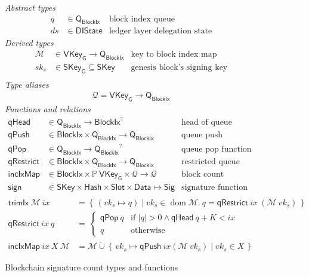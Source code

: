 \documentclass[11pt,a4paper]{article}
\DeclareMathOperator{\dom}{dom}
\newcommand{\powerset}[1]{\mathbb{P}~#1}
\newcommand\Set[2]{\left\{\,#1\mid#2\,\right\}}
\newcommand{\unionoverride}{\mathbin{\underrightarrow\cup}}
\newcommand{\var}[1]{\mathit{#1}}
\newcommand{\fun}[1]{\mathsf{#1}}
\newcommand{\type}[1]{\mathsf{#1}}
\newcommand{\size}[1]{\left| #1 \right|}
\newcommand{\Hash}{\type{Hash}}  %
\newcommand{\Slot}{\type{Slot}}
\newcommand{\BlockIx}{\type{BlockIx}}
\newcommand{\Queue}{\type{Q}}
\newcommand{\SKey}{\type{SKey}}
\newcommand{\SKeyGen}{\type{SKey_G}}
\newcommand{\VKeyGen}{\type{VKey_G}}
\newcommand{\Sig}{\type{Sig}}
\newcommand{\Data}{\type{Data}}
\newcommand{\DelegState}{\type{DIState}}
\newcommand{\signname}{sign}
\newcommand{\signmapname}{\mathcal{M}}
\newcommand{\trimixname}{trimIx}
\newcommand{\incixmapname}{incIxMap}
\newcommand{\qrestrname}{qRestrict}
\newcommand{\qpopname}{qPop}
\newcommand{\qheadname}{qHead}
\newcommand{\qpushname}{qPush}
\newcommand{\signmap}[1]{\fun{\signmapname} ~ #1}
\newcommand{\qrestr}[2]{\fun{\qrestrname} ~ #1 ~ #2}
\newcommand{\trimix}[2]{\fun{\trimixname} ~ #1 ~ #2}
\newcommand{\incixmap}[3]{\fun{\incixmapname} ~ #1 ~ #2 ~ #3}
\newcommand{\qpop}[1]{\fun{\qpopname} ~ #1}
\newcommand{\qhead}[1]{\fun{\qheadname} ~ #1}
\newcommand{\qpush}[1]{\fun{\qpushname} ~ #1}
\newcommand{\totalf}{\to}
\newcommand{\partialf}{\mapsto}
\newcommand{\mapqueue}{\mathcal{Q}}
\begin{document}
\begin{figure}[ht]
  \emph{Abstract types}
  \begin{align*}
    q  & \in \Queue_\BlockIx  & \text{block index queue}\\
    \var{ds} & \in \DelegState & \text{ledger layer delegation state}
  \end{align*}
  \emph{Derived types}
  \begin{align*}
    \signmapname & \in \VKeyGen \totalf \Queue_\BlockIx & \text{key to block index map}\\
    \var{sk_s} & \in \SKeyGen \subseteq \SKey & \text{genesis block's signing key}\\
  \end{align*}
  \emph{Type aliases}
  \begin{align*}
    \mapqueue = \VKeyGen \totalf \Queue_\BlockIx
  \end{align*}
  \emph{Functions and relations}
  \begin{align*}
    \fun{\qheadname} & \in \Queue_\BlockIx \totalf \BlockIx^? & \text{head of queue function} \\
    \fun{\qpushname} & \in \BlockIx \times \Queue_\BlockIx \totalf \Queue_\BlockIx
      & \text{queue push function} \\
    \fun{\qpopname} & \in \Queue_\BlockIx \totalf {\Queue_\BlockIx}^?
      & \text{queue pop function} \\
    \fun{\qrestrname} & \in \BlockIx \times \Queue_\BlockIx \totalf \Queue_\BlockIx
      & \text{restricted queue pop function} \\
    \fun{\incixmapname} & \in \BlockIx \times \powerset \VKeyGen \times \mapqueue \totalf \mapqueue
      & \text{block count increment function}\\
    \fun{\signname} & \in \SKey \times \Hash \times \Slot \times \Data \partialf \Sig
      & \text{signature function}\\
  \end{align*}
  \begin{align}
  \label{eq:trimix}
  \trimix{\signmapname}{\var{ix}} & = \Set{(\var{vk_s} \partialf q)}{\var{vk_s} \in \dom \signmapname.~
  q = \qrestr{\var{ix}}{(\signmap{\var{vk_s}}})} \\
  \qrestr{\var{ix}}{q} & = \
  \begin{cases}
    \qpop{q} & \text{if } \size{q} > 0 \wedge \qhead{q} + K < \var{ix} \\
    q & \text{otherwise}
  \end{cases} \\
  \label{eq:incixmap}
    \incixmap{\var{ix}}{\var{X}}{\signmapname} & = \signmapname \unionoverride
                                                 \Set{\var{vk_s} \partialf \qpush{\var{ix}}(\signmap{\var{vk_s}})}{vk_s \in \var{X}}
  \end{align}
  \caption{Blockchain signature count types and functions}
  \label{fig:defs:sigcnt}
\end{figure}
\end{document}
